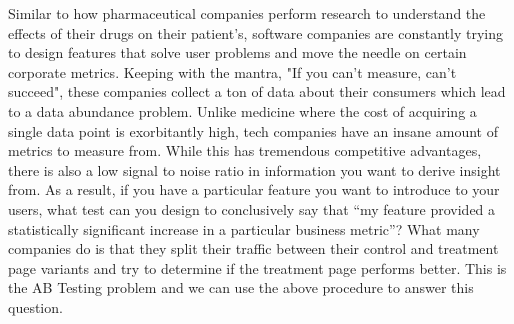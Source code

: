 \documentclass[12pt]{report}
\begin{document}
Similar to how pharmaceutical companies perform research to understand the effects of their drugs on their patient's, 
software companies are constantly trying to design features that solve user problems and move the needle on certain corporate metrics. 
Keeping with the mantra, "If you can’t measure, can’t succeed", these companies collect a ton of data about their consumers which lead 
to a data abundance problem. Unlike medicine where the cost of acquiring a single data point is exorbitantly high,
tech companies have an insane amount of metrics to measure from. While this has tremendous competitive advantages, 
there is also a low signal to noise ratio in information you want to derive insight from. As a result, if you have a 
particular feature you want to introduce to your users, what test can you design to conclusively say that 
“my feature provided a statistically significant increase in a particular business metric”? What many companies 
do is that they split their traffic between their control and treatment page variants and try to determine if the 
treatment page performs better.  This is the AB Testing problem and we can use the above procedure to answer this question.
\end{document}
